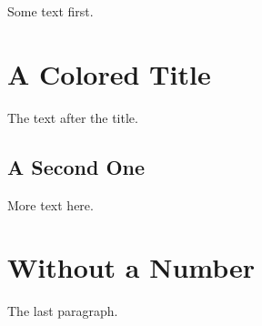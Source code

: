 \documentclass{article}
\begin{document}
Some text first.

\section{A Colored Title}
The text after the title.

\subsection{A Second One}
More text here.

\section*{Without a Number}
The last paragraph.
\end{document}
